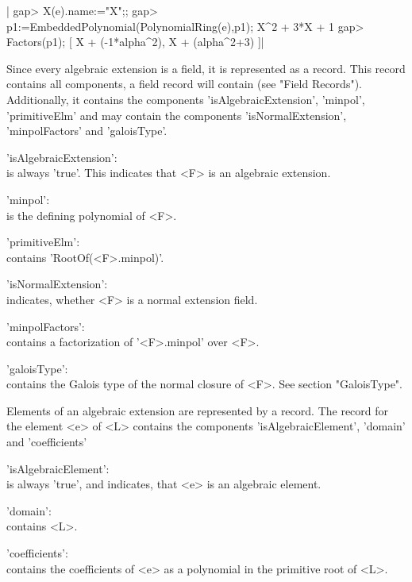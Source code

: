 |    gap> X(e).name:="X";;
    gap> p1:=EmbeddedPolynomial(PolynomialRing(e),p1);
    X^2 + 3*X + 1
    gap> Factors(p1);
    [ X + (-1*alpha^2), X + (alpha^2+3) ]|


Since every algebraic extension is a field, it is represented as a
record.  This record contains all components, a field record will contain
(see "Field Records").  Additionally, it contains the components
'isAlgebraicExtension', 'minpol', 'primitiveElm' and may contain the
components 'isNormalExtension', 'minpolFactors' and 'galoisType'.

'isAlgebraicExtension': \\
    is always 'true'. This indicates that <F> is an algebraic extension.

'minpol': \\
    is the defining polynomial of <F>.

'primitiveElm': \\
    contains 'RootOf(<F>.minpol)'.

'isNormalExtension': \\
     indicates, whether <F> is a normal extension field.

'minpolFactors': \\
    contains a factorization of '<F>.minpol' over <F>.

'galoisType': \\
    contains the Galois type of the normal closure of <F>.
    See section "GaloisType".


Elements of an algebraic extension are represented by a record.  The
record for the element <e> of <L> contains the components
'isAlgebraicElement', 'domain' and 'coefficients'\:

'isAlgebraicElement': \\
    is always 'true', and indicates, that <e> is an algebraic element.

'domain': \\
    contains <L>.

'coefficients': \\
    contains the coefficients of <e> as a polynomial in the primitive
    root of <L>.

